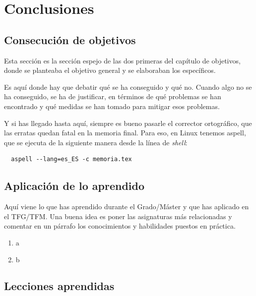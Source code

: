 \documentclass[a4paper, 12pt]{book}
\begin{document}

\cleardoublepage
\chapter{Conclusiones}
\label{chap:conclusiones}


\section{Consecución de objetivos}
\label{sec:consecucion-objetivos}

Esta sección es la sección espejo de las dos primeras del capítulo de objetivos, donde se planteaba el objetivo general y se elaboraban los específicos.

Es aquí donde hay que debatir qué se ha conseguido y qué no. 
Cuando algo no se ha conseguido, se ha de justificar, en términos de qué problemas se han encontrado y qué medidas se han tomado para mitigar esos problemas.

Y si has llegado hasta aquí, siempre es bueno pasarle el corrector ortográfico, que las erratas quedan fatal en la memoria final.
Para eso, en Linux tenemos aspell, que se ejecuta de la siguiente manera desde la línea de \emph{shell}:

\begin{verbatim}
  aspell --lang=es_ES -c memoria.tex
\end{verbatim}

\section{Aplicación de lo aprendido}
\label{sec:aplicacion}

Aquí viene lo que has aprendido durante el Grado/Máster y que has aplicado en el TFG/TFM.
Una buena idea es poner las asignaturas más relacionadas y comentar en un párrafo los conocimientos y habilidades puestos en práctica.

\begin{enumerate}
  \item a
  \item b
\end{enumerate}


\section{Lecciones aprendidas}
\label{sec:lecciones_aprendidas}
\end{document}
